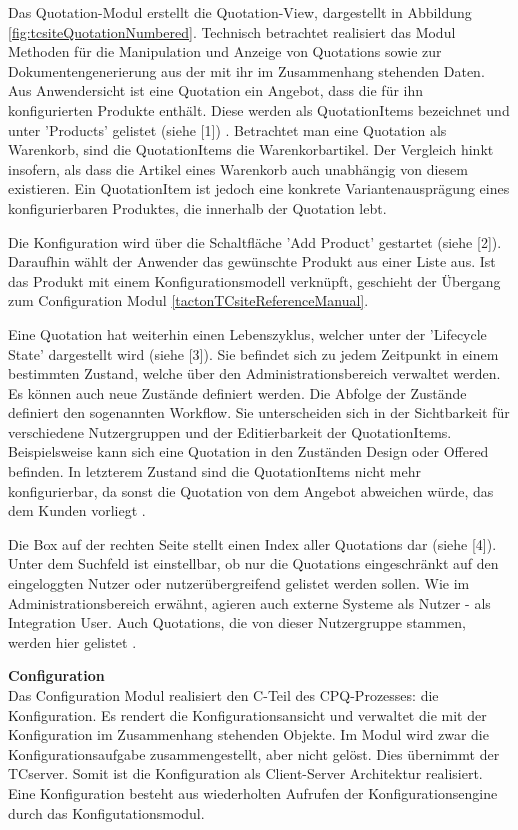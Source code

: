 \documentclass[12pt,a4paper,bibliography=totocnumbered,listof=totoc]{scrartcl}
\begin{document}
Das Quotation-Modul erstellt die Quotation-View, dargestellt in Abbildung \ref{fig:tcsiteQuotationNumbered}. Technisch betrachtet realisiert das Modul Methoden für die Manipulation und Anzeige von Quotations sowie zur Dokumentengenerierung aus der mit ihr im Zusammenhang stehenden Daten. Aus Anwendersicht ist eine Quotation ein Angebot, dass die für ihn konfigurierten Produkte enthält. Diese werden als QuotationItems bezeichnet und unter 'Products' gelistet (siehe [1]) \citep{tactonTCsiteDevelopmentManual}. Betrachtet man eine Quotation als Warenkorb, sind die QuotationItems die Warenkorbartikel. Der Vergleich hinkt insofern, als dass die Artikel eines Warenkorb auch unabhängig von diesem existieren. Ein QuotationItem ist jedoch eine konkrete Variantenausprägung eines konfigurierbaren Produktes, die innerhalb der Quotation lebt.

Die Konfiguration wird über die Schaltfläche 'Add Product' gestartet (siehe [2]). Daraufhin wählt der Anwender das gewünschte Produkt aus einer Liste aus. Ist das Produkt mit einem Konfigurationsmodell verknüpft, geschieht der Übergang zum Configuration Modul \ref{tactonTCsiteReferenceManual}.

Eine Quotation hat weiterhin einen Lebenszyklus, welcher unter der 'Lifecycle State' dargestellt wird (siehe [3]). Sie befindet sich zu jedem Zeitpunkt in einem bestimmten Zustand, welche über den Administrationsbereich verwaltet werden. Es können auch neue Zustände definiert werden. Die Abfolge der Zustände definiert den sogenannten \glqq Workflow\grqq{}. Sie unterscheiden sich in der Sichtbarkeit für verschiedene Nutzergruppen und der Editierbarkeit der QuotationItems. Beispielsweise kann sich eine Quotation in den Zuständen \glqq Design\grqq{} oder \glqq Offered\grqq{} befinden. In letzterem Zustand sind die QuotationItems nicht mehr konfigurierbar, da sonst die Quotation von dem Angebot abweichen würde, das dem Kunden vorliegt \citep{tactonTCsiteReferenceManual}.

Die Box auf der rechten Seite stellt einen Index aller Quotations dar (siehe [4]). Unter dem Suchfeld ist einstellbar, ob nur die Quotations eingeschränkt auf den eingeloggten Nutzer oder nutzerübergreifend gelistet werden sollen. Wie im Administrationsbereich erwähnt, agieren auch externe Systeme als Nutzer - als Integration User. Auch Quotations, die von dieser Nutzergruppe stammen, werden hier gelistet  \citep{tactonTCsiteReferenceManual}.

\textbf{Configuration}\\
Das Configuration Modul realisiert den C-Teil des CPQ-Prozesses: die Konfiguration. Es rendert die Konfigurationsansicht und verwaltet die mit der Konfiguration im Zusammenhang stehenden Objekte. Im Modul wird zwar die Konfigurationsaufgabe zusammengestellt, aber nicht gelöst. Dies übernimmt der TCserver. Somit ist die Konfiguration als Client-Server Architektur realisiert. Eine Konfiguration besteht aus wiederholten Aufrufen der Konfigurationsengine durch das Konfigutationsmodul.
\end{document}
